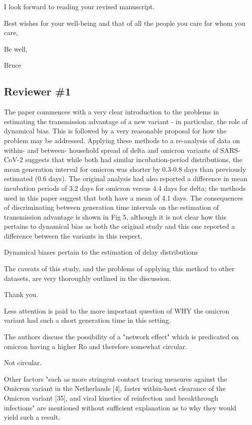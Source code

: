 \documentclass[12pt]{article}
\newcommand{\rev}{\subsection*}
\newcommand{\revtext}{\textsf}
\begin{document}
I look forward to reading your revised manuscript.

Best wishes for your well-being and that of all the people you care for whom you care,

Be well,

Bruce


\rev{Reviewer \#1}

\revtext{The paper commences with a very clear introduction to the problems in estimating the transmission advantage of a new variant - in particular, the role of dynamical bias. This is followed by a very reasonable proposal for how the problem may be addressed. Applying these methods to a re-analysis of data on within- and between- household spread of delta and omicron variants of SARS-CoV-2 suggests that while both had similar incubation-period distributions, the mean generation interval for omicron was shorter by 0.3-0.8 days than previously estimated (0.6 days). The original analysis had also reported a difference in mean incubation periods of 3.2 days for omicron versus 4.4 days for delta; the methods used in this paper suggest that both have a mean of 4.1 days. The consequences of discriminating between generation time intervals on the estimation of transmission advantage is shown in Fig 5, although it is not clear how this pertains to dynamical bias as both the original study and this one reported a difference between the variants in this respect.}

Dynamical biases pertain to the estimation of delay distributions 

\revtext{The caveats of this study, and the problems of applying this method to other datasets, are very thoroughly outlined in the discussion.} 

Thank you.

\revtext{Less attention is paid to the more important question of WHY the omicron variant had such a short generation time in this setting.}

\revtext{The authors discuss the possibility of a "network effect" which is predicated on omicron having a higher Ro and therefore somewhat circular.}

Not circular.

\revtext{Other factors "such as more stringent contact tracing measures against the Omicron variant in the Netherlands [4], faster within-host clearance of the Omicron variant [35], and viral kinetics of reinfection and breakthrough infections" are mentioned without sufficient explanation as to why they would yield such a result.}
\end{document}
